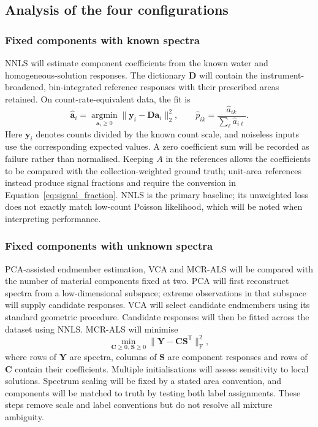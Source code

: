 \documentclass[11pt]{article}
\begin{document}
\subsection{Analysis of the four configurations}
\subsubsection{Fixed components with known spectra}

NNLS will estimate component coefficients from the known water and homogeneous-solution responses. The dictionary $\mathbf D$ will contain the instrument-broadened, bin-integrated reference responses with their prescribed areas retained. On count-rate-equivalent data, the fit is
\begin{equation}
 \widehat{\mathbf a}_i=\underset{\mathbf a_i\geq0}{\operatorname{argmin}}
 \|\mathbf y_i-\mathbf D\mathbf a_i\|_2^2,
 \qquad \widehat p_{ik}=\frac{\widehat a_{ik}}{\sum_\ell\widehat a_{i\ell}}.
 \label{eq:known_fit}
\end{equation}
Here $\mathbf y_i$ denotes counts divided by the known count scale, and noiseless inputs use the corresponding expected values. A zero coefficient sum will be recorded as failure rather than normalised. Keeping $A$ in the references allows the coefficients to be compared with the collection-weighted ground truth; unit-area references instead produce signal fractions and require the conversion in Equation~\ref{eq:signal_fraction}. NNLS is the primary baseline; its unweighted loss does not exactly match low-count Poisson likelihood, which will be noted when interpreting performance.

\subsubsection{Fixed components with unknown spectra}

PCA-assisted endmember estimation, VCA and MCR-ALS will be compared with the number of material components fixed at two. PCA will first reconstruct spectra from a low-dimensional subspace; extreme observations in that subspace will supply candidate responses. VCA will select candidate endmembers using its standard geometric procedure. Candidate responses will then be fitted across the dataset using NNLS. MCR-ALS will minimise
\begin{equation}
 \min_{\mathbf C\geq0,\,\mathbf S\geq0}
 \|\mathbf Y-\mathbf C\mathbf S^{\mathsf T}\|_{\mathrm F}^{2},
 \label{eq:mcr}
\end{equation}
where rows of $\mathbf Y$ are spectra, columns of $\mathbf S$ are component responses and rows of $\mathbf C$ contain their coefficients. Multiple initialisations will assess sensitivity to local solutions. Spectrum scaling will be fixed by a stated area convention, and components will be matched to truth by testing both label assignments. These steps remove scale and label conventions but do not resolve all mixture ambiguity.
\end{document}
